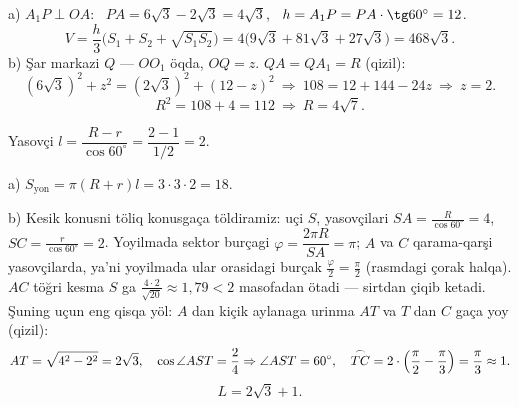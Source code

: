 a) $A_1P\perp OA$: \ $PA=6\sqrt3-2\sqrt3=4\sqrt3$, \ $h=A_1P=PA\cdot\tg60^\circ=12$.
\[V=\frac h3\bigl(S_1+S_2+\sqrt{S_1S_2}\bigr)=4\bigl(9\sqrt3+81\sqrt3+27\sqrt3\bigr)=468\sqrt3.\]
b) Şar markazi $Q$ — $OO_1$ öqda, $OQ=z$. $QA=QA_1=R$ (\textcolor{aux}{qizil}):
\[(6\sqrt3)^2+z^2=(2\sqrt3)^2+(12-z)^2\ \Rightarrow\ 108=12+144-24z\ \Rightarrow\ z=2.\]
\[R^2=108+4=112\ \Rightarrow\ R=4\sqrt7.\]

\newpage
{}
Yasovçi $l=\dfrac{R-r}{\cos60^\circ}=\dfrac{2-1}{1/2}=2$.

a) $S_{\text{yon}}=\pi(R+r)l=3\cdot3\cdot2=18$.

b) Kesik konusni töliq konusgaça töldiramiz: uçi $S$, yasovçilari $SA=\frac R{\cos60^\circ}=4$, \ $SC=\frac r{\cos60^\circ}=2$. Yoyilmada sektor burçagi $\varphi=\dfrac{2\pi R}{SA}=\pi$; $A$ va $C$ qarama-qarşi yasovçilarda, ya'ni yoyilmada ular orasidagi burçak $\frac\varphi2=\frac\pi2$ (rasmdagi çorak halqa).\\
$AC$ töğri kesma $S$ ga $\frac{4\cdot2}{\sqrt{20}}\approx1{,}79<2$ masofadan ötadi — sirtdan çiqib ketadi. Şuning uçun eng qisqa yöl: $A$ dan kiçik aylanaga urinma $AT$ va $T$ dan $C$ gaça yoy (\textcolor{aux}{qizil}):
\[AT=\sqrt{4^2-2^2}=2\sqrt3,\quad \cos\angle AST=\frac24\Rightarrow\angle AST=60^\circ,\quad \overset{\frown}{TC}=2\cdot\Bigl(\frac\pi2-\frac\pi3\Bigr)=\frac\pi3\approx1.\]
\[L=2\sqrt3+1.\]

\ShowJavoblar

